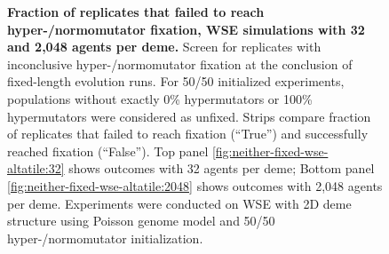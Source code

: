 \begin{figure}[h]
  \begin{minipage}{\textwidth}
    \caption{%
\textbf{Fraction of replicates that failed to reach hyper-/normomutator fixation, WSE simulations with 32 and 2,048 agents per deme.}
\footnotesize
Screen for replicates with inconclusive hyper-/normomutator fixation at the conclusion of fixed-length evolution runs.
For 50/50 initialized experiments, populations without exactly 0\% hypermutators or 100\% hypermutators were considered as unfixed.
Strips compare fraction of replicates that failed to reach fixation (``True'') and successfully reached fixation (``False'').
Top panel \ref{fig:neither-fixed-wse-altatile:32} shows outcomes with 32 agents per deme;
Bottom panel \ref{fig:neither-fixed-wse-altatile:2048} shows outcomes with 2,048 agents per deme.
Experiments were conducted on WSE with 2D deme structure using Poisson genome model and 50/50 hyper-/normomutator initialization.
    }
    \label{fig:neither-fixed-wse-altatile}
  \end{minipage}
\end{figure}
